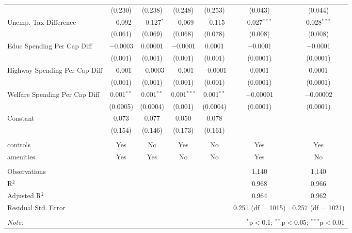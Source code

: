\begin{table}[!htbp]
\begin{tabular}{@{\extracolsep{5pt}}lcccccc}
  & (0.230) & (0.238) & (0.248) & (0.253) & (0.043) & (0.044) \\ 
  Unemp. Tax Difference & $-$0.092 & $-$0.127$^{*}$ & $-$0.069 & $-$0.115 & 0.027$^{***}$ & 0.028$^{***}$ \\ 
  & (0.061) & (0.069) & (0.068) & (0.078) & (0.008) & (0.008) \\ 
  Educ Spending Per Cap Diff & $-$0.0003 & 0.00001 & $-$0.0001 & 0.0001 & $-$0.0001 & $-$0.0001 \\ 
  & (0.001) & (0.001) & (0.001) & (0.001) & (0.0001) & (0.0001) \\ 
  Highway Spending Per Cap Diff & $-$0.001 & $-$0.0003 & $-$0.001 & $-$0.0001 & 0.0001 & 0.0001 \\ 
  & (0.001) & (0.001) & (0.001) & (0.001) & (0.0001) & (0.0001) \\ 
  Welfare Spending Per Cap Diff & 0.001$^{**}$ & 0.001$^{**}$ & 0.001$^{***}$ & 0.001$^{**}$ & $-$0.00001 & $-$0.00002 \\ 
  & (0.0005) & (0.0004) & (0.001) & (0.0004) & (0.0001) & (0.0001) \\ 
  Constant & 0.073 & 0.077 & 0.050 & 0.078 &  &  \\ 
  & (0.154) & (0.146) & (0.173) & (0.161) &  &  \\ 
 \hline \\[-1.8ex] 
controls & Yes & No & Yes & No & Yes & Yes \\ 
amenities & Yes & Yes & No & No & Yes & No \\ 
\hline \\[-1.8ex] 
Observations &  &  &  &  & 1,140 & 1,140 \\ 
R$^{2}$ &  &  &  &  & 0.968 & 0.966 \\ 
Adjusted R$^{2}$ &  &  &  &  & 0.964 & 0.962 \\ 
Residual Std. Error &  &  &  &  & 0.251 (df = 1015) & 0.257 (df = 1021) \\ 
\hline 
\hline \\[-1.8ex] 
\textit{Note:}  & \multicolumn{6}{r}{$^{*}$p$<$0.1; $^{**}$p$<$0.05; $^{***}$p$<$0.01} \\ 
\end{tabular} 
\end{table} 
